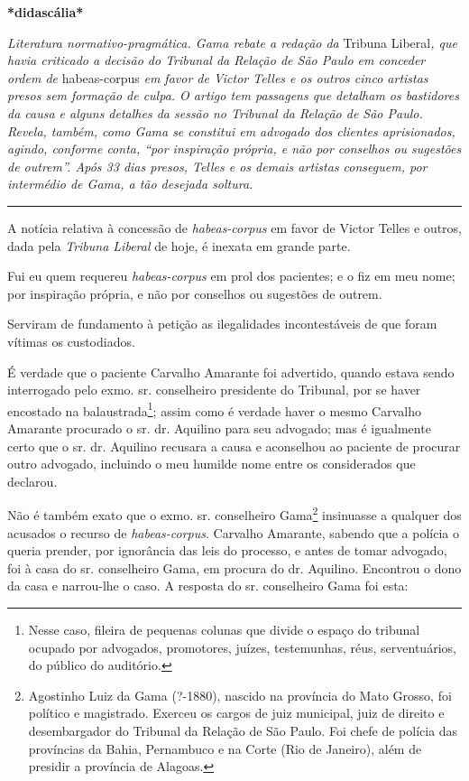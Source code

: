 \textbf{*didascália*}

\emph{Literatura normativo-pragmática. Gama rebate a redação da} Tribuna
Liberal\emph{, que havia criticado a decisão do Tribunal da Relação de
São Paulo em conceder ordem de} habeas-corpus \emph{em favor de Victor
Telles e os outros cinco artistas presos sem formação de culpa. O artigo
tem passagens que detalham os bastidores da causa e alguns detalhes da
sessão no Tribunal da Relação de São Paulo. Revela, também, como Gama se
constitui em advogado dos clientes aprisionados, agindo, conforme conta,
``por inspiração própria, e não por conselhos ou sugestões de outrem''.
Após 33 dias presos, Telles e os demais artistas conseguem, por
intermédio de Gama, a tão desejada soltura. }

\begin{center}\rule{0.5\linewidth}{\linethickness}\end{center}

A notícia relativa à concessão de \emph{habeas-corpus} em favor de
Victor Telles e outros, dada pela \emph{Tribuna Liberal} de hoje, é
inexata em grande parte.

Fui eu quem requereu \emph{habeas-corpus} em prol dos pacientes; e o fiz
em meu nome; por inspiração própria, e não por conselhos ou sugestões de
outrem.

Serviram de fundamento à petição as ilegalidades incontestáveis de que
foram vítimas os custodiados.

É verdade que o paciente Carvalho Amarante foi advertido, quando estava
sendo interrogado pelo exmo. sr. conselheiro presidente do Tribunal, por
se haver encostado na balaustrada\footnote{Nesse caso, fileira de
  pequenas colunas que divide o espaço do tribunal ocupado por
  advogados, promotores, juízes, testemunhas, réus, serventuários, do
  público do auditório.}; assim como é verdade haver o mesmo Carvalho
Amarante procurado o sr. dr. Aquilino para seu advogado; mas é
igualmente certo que o sr. dr. Aquilino recusara a causa e aconselhou ao
paciente de procurar outro advogado, incluindo o meu humilde nome entre
os considerados que declarou.

Não é também exato que o exmo. sr. conselheiro Gama\footnote{Agostinho
  Luiz da Gama (?-1880), nascido na província do Mato Grosso, foi
  político e magistrado. Exerceu os cargos de juiz municipal, juiz de
  direito e desembargador do Tribunal da Relação de São Paulo. Foi chefe
  de polícia das províncias da Bahia, Pernambuco e na Corte (Rio de
  Janeiro), além de presidir a província de Alagoas.} insinuasse a
qualquer dos acusados o recurso de \emph{habeas-corpus}. Carvalho
Amarante, sabendo que a polícia o queria prender, por ignorância das
leis do processo, e antes de tomar advogado, foi à casa do sr.
conselheiro Gama, em procura do dr. Aquilino. Encontrou o dono da casa e
narrou-lhe o caso. A resposta do sr. conselheiro Gama foi esta:

